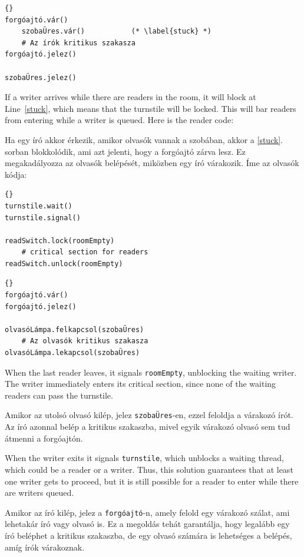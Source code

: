 \documentclass{book}
\begin{document}
\begin{lstlisting}[title={Kiéheztethetetlen író megoldás}]{}
forgóajtó.vár()
    szobaÜres.vár()           (* \label{stuck} *)
    # Az írók kritikus szakasza
forgóajtó.jelez()

szobaÜres.jelez()
\end{lstlisting}

If a writer arrives while there are readers in the room, it
will block at Line~\ref{stuck}, which means that the turnstile will
be locked.  This will bar readers from entering while a writer
is queued.  Here is the reader code:

Ha egy író akkor érkezik, amikor olvasók vannak a szobában,
akkor a \ref{stuck}. sorban blokkolódik, ami azt jelenti, hogy a
forgóajtó zárva lesz. Ez megakadályozza az olvasók belépését,
miközben egy író várakozik. 
Íme az olvasók kódja:

\begin{lstlisting}[title={No-starve reader solution}]{}
turnstile.wait()
turnstile.signal()

readSwitch.lock(roomEmpty)
    # critical section for readers
readSwitch.unlock(roomEmpty)
\end{lstlisting}

\begin{lstlisting}[title={Kiéheztethetetlen olvasó megoldás}]{}
forgóajtó.vár()
forgóajtó.jelez()

olvasóLámpa.felkapcsol(szobaÜres)
    # Az olvasók kritikus szakasza
olvasóLámpa.lekapcsol(szobaÜres)
\end{lstlisting}

When the last reader leaves, it signals {\tt roomEmpty},
unblocking the waiting writer.  The writer immediately
enters its critical section, since none of the waiting
readers can pass the turnstile.

Amikor az utolsó olvasó kilép, jelez {\tt szobaÜres}-en, ezzel feloldja a
várakozó írót. Az író azonnal belép a kritikus szakaszba, mivel egyik
várakozó olvasó sem tud átmenni a forgóajtón.

When the writer exits it signals {\tt turnstile}, which unblocks a
waiting thread, which could be a reader or a writer.  Thus, this
solution guarantees that at least one writer gets to proceed, but it
is still possible for a reader to enter while there are writers
queued.  

Amikor az író kilép, jelez a {\tt forgóajtó}-n, amely felold egy
várakozó szálat, ami lehetakár író vagy olvasó is. Ez a megoldás tehát
garantálja, hogy legalább egy író beléphet a kritikus szakaszba,
de egy olvasó számára is lehetséges a belépés, amíg írók várakoznak. 
\end{document}
